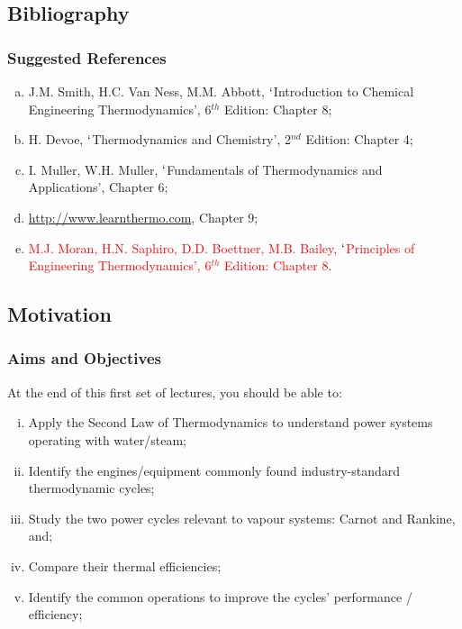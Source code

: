 \documentclass[10pt,compress]{beamer}
\newcommand{\red}{\textcolor{red}}
\begin{document}
 

\subsection{Bibliography} 
\begin{frame}
 \frametitle{Suggested References}
  \begin{enumerate}[(a)]
   \item J.M. Smith, H.C. Van Ness, M.M. Abbott, $\lq$Introduction to Chemical Engineering Thermodynamics', 6$^{th}$ Edition: Chapter 8;
   \item H. Devoe, $\lq$Thermodynamics and Chemistry', 2$^{nd}$ Edition: Chapter 4;
   \item I. Muller, W.H. Muller, $\lq$Fundamentals of Thermodynamics and Applications', Chapter 6;
   \item \href{http://www.learnthermo.com}{http://www.learnthermo.com}, Chapter 9;
   \item \red{M.J. Moran, H.N. Saphiro, D.D. Boettner, M.B. Bailey, $\lq$Principles of Engineering Thermodynamics', 6$^{th}$ Edition: Chapter 8}.
  \end{enumerate}
\end{frame}


\subsection{Motivation}

\begin{frame}
   \frametitle{Aims and Objectives}
   At the end of this first set of lectures, you should be able to:
   \begin{enumerate}[(i)]
      \item <2-> Apply the Second Law of Thermodynamics to understand power systems operating with water/steam;
      \item <3-> Identify the engines/equipment commonly found industry-standard thermodynamic cycles; 
      \item <4-> Study the two power cycles relevant to vapour systems: Carnot and Rankine, and; 
      \item <5-> Compare their thermal efficiencies;
      \item <6-> Identify the common operations to improve the cycles' performance / efficiency;
   \end{enumerate}
\end{frame}
 
\end{document}
